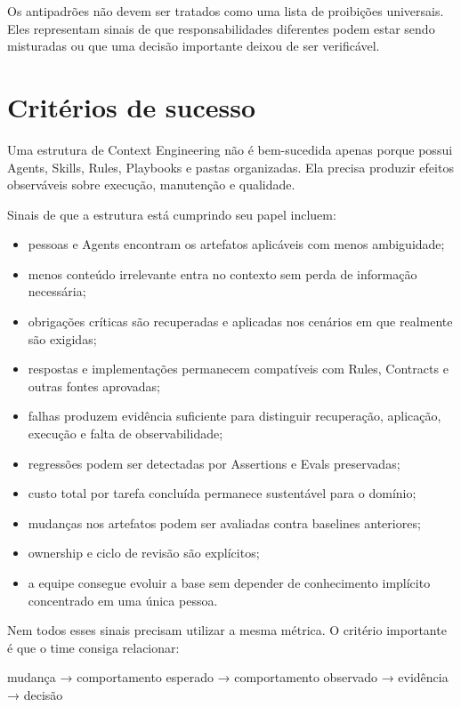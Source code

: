 \documentclass[
  10pt,
  a4paper,
  oneside]{book}
\newenvironment{Shaded}{}{}
\newcommand{\NormalTok}[1]{#1}
\providecommand{\tightlist}{%
  \setlength{\itemsep}{0pt}\setlength{\parskip}{0pt}}
\renewenvironment{Shaded}{\begin{snugshade}}{\end{snugshade}}%
\begin{document}
Os antipadrões não devem ser tratados como uma lista de proibições
universais. Eles representam sinais de que responsabilidades diferentes
podem estar sendo misturadas ou que uma decisão importante deixou de ser
verificável.

\hypertarget{crituxe9rios-de-sucesso}{%
\section{Critérios de sucesso}\label{crituxe9rios-de-sucesso}}

Uma estrutura de Context Engineering não é bem-sucedida apenas porque
possui Agents, Skills, Rules, Playbooks e pastas organizadas. Ela
precisa produzir efeitos observáveis sobre execução, manutenção e
qualidade.

Sinais de que a estrutura está cumprindo seu papel incluem:

\begin{itemize}
\tightlist
\item
  pessoas e Agents encontram os artefatos aplicáveis com menos
  ambiguidade;
\item
  menos conteúdo irrelevante entra no contexto sem perda de informação
  necessária;
\item
  obrigações críticas são recuperadas e aplicadas nos cenários em que
  realmente são exigidas;
\item
  respostas e implementações permanecem compatíveis com Rules, Contracts
  e outras fontes aprovadas;
\item
  falhas produzem evidência suficiente para distinguir recuperação,
  aplicação, execução e falta de observabilidade;
\item
  regressões podem ser detectadas por Assertions e Evals preservadas;
\item
  custo total por tarefa concluída permanece sustentável para o domínio;
\item
  mudanças nos artefatos podem ser avaliadas contra baselines
  anteriores;
\item
  ownership e ciclo de revisão são explícitos;
\item
  a equipe consegue evoluir a base sem depender de conhecimento
  implícito concentrado em uma única pessoa.
\end{itemize}

Nem todos esses sinais precisam utilizar a mesma métrica. O critério
importante é que o time consiga relacionar:

\begin{Shaded}
\begin{Highlighting}[]
\NormalTok{mudança}
\NormalTok{→ comportamento esperado}
\NormalTok{→ comportamento observado}
\NormalTok{→ evidência}
\NormalTok{→ decisão}
\end{Highlighting}
\end{Shaded}
\end{document}
